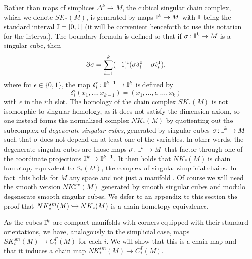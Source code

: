 Rather than maps of simplices $\Delta^k \to M$, the cubical singular chain complex, which we denote $SK_*(M)$, is generated by maps $\mathbb{I}^k \to M$ with $\mathbb{I}$ being the standard interval $\mathbb{I} = [0,1]$ (it will be convenient henceforth to use this notation for the interval).
The boundary formula is defined so that if $\sigma: \mathbb{I}^k \to M$ is a singular cube, then
\begin{equation}\label{E: cube bd}
	\partial \sigma = \sum_{i = 1}^k (-1)^i(\sigma \delta_i^0-\sigma \delta^1_i),
\end{equation}
where for $\epsilon\in\{0,1\}$, the map $\delta_i^\epsilon \colon \mathbb{I}^{k-1} \to \mathbb{I}^k$ is defined by
$$\delta_i^\epsilon(x_1,\ldots,x_{k-1}) = (x_1,\ldots,\epsilon,\ldots, x_k)$$
with $\epsilon$ in the $i$th slot.
The homology of the chain complex $SK_*(M)$ is not isomorphic to singular homology, as it does not satisfy the dimension axiom, so one instead forms the normalized complex $NK_*(M)$ by quotienting out the subcomplex of \textit{degenerate singular cubes}, generated by singular cubes $\sigma \colon \mathbb{I}^k \to M$ such that $\sigma$ does not depend on at least one of the variables.
In other words, the degenerate singular cubes are those maps $\sigma \colon \mathbb{I}^k \to M$ that factor through one of the coordinate projections $\mathbb{I}^k \to \mathbb{I}^{k-1}$.
It then holds that $NK_*(M)$ is chain homotopy equivalent to $S_*(M)$, the complex of singular simplicial chains.
In fact, this holds for $M$ any space and not just a manifold \cite[Theorem 8.4.7]{HW60}.
Of course we will need the smooth version $NK^{sm}_*(M)$ generated by smooth singular cubes and modulo degenerate smooth singular cubes.
We defer to an appendix to this section the proof that $NK^{sm}_*(M) \hookrightarrow NK_*(M)$ is a chain homotopy equivalence.

As the cubes $\mathbb{I}^k$ are compact manifolds with corners equipped with their standard orientations,
we have, analogously to the simplicial case, maps $SK^{sm}_i(M) \to C_i^\Gamma(M)$ for each $i$.
We will show that this is a chain map and that it induces a chain map $NK^{sm}_*(M) \to C_*^\Gamma(M)$.




